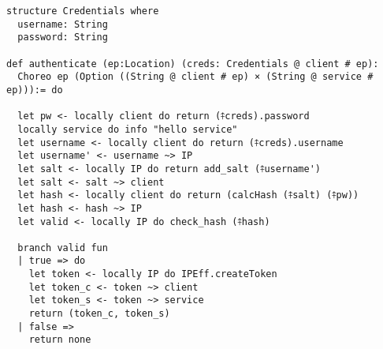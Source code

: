 \begin{lstlisting}[language=lean]
structure Credentials where
  username: String
  password: String

def authenticate (ep:Location) (creds: Credentials @ client # ep):
  Choreo ep (Option ((String @ client # ep) × (String @ service # ep))):= do

  let pw <- locally client do return (⤉creds).password
  locally service do info "hello service"
  let username <- locally client do return (⤉creds).username
  let username' <- username ~> IP
  let salt <- locally IP do return add_salt (⤉username')
  let salt <- salt ~> client
  let hash <- locally client do return (calcHash (⤉salt) (⤉pw))
  let hash <- hash ~> IP
  let valid <- locally IP do check_hash (⤉hash)

  branch valid fun
  | true => do
    let token <- locally IP do IPEff.createToken
    let token_c <- token ~> client
    let token_s <- token ~> service
    return (token_c, token_s)
  | false =>
    return none
\end{lstlisting}
